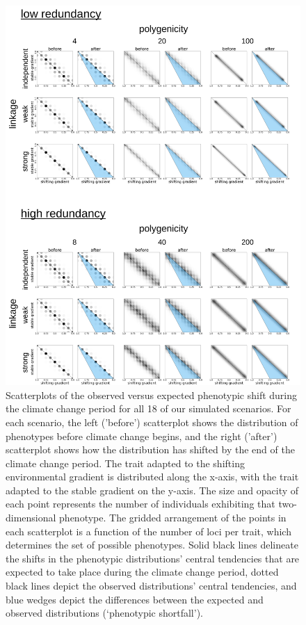 \documentclass[9pt,twoside,lineno]{new_article}
\begin{document}
\begin{figure}
\centering
\includegraphics[width=.8\linewidth]{pub/figs_and_stats/FIG_S4_phenotypic_shift_null_ROWLABELS_CORRECTED.png}
    \caption{Scatterplots of the observed versus expected phenotypic shift during the climate change period for all 18 of our simulated scenarios. For each scenario, the left (’before’) scatterplot shows the distribution of phenotypes before climate change begins, and the right (’after’) scatterplot shows how the distribution has shifted by the end of the climate change period. The trait adapted to the shifting environmental gradient is distributed along the x-axis, with the trait adapted to the stable gradient on the y-axis. The size and opacity of each point represents the number of individuals exhibiting that two-dimensional phenotype. The gridded arrangement of the points in each scatterplot is a function of the number of loci per trait, which determines the set of possible phenotypes. Solid black lines delineate the shifts in the phenotypic distributions’ central tendencies that are expected to take place during the climate change period, dotted black lines depict the observed distributions’ central tendencies, and blue wedges depict the differences between the expected and observed distributions (‘phenotypic shortfall’).}
\label{fig:fig_s4}
\end{figure}
\end{document}
